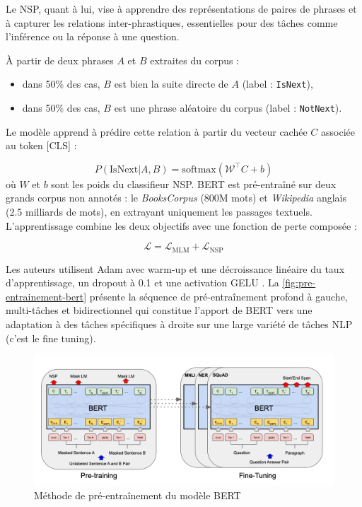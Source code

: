 Le NSP, quant à lui, vise à apprendre des représentations de paires de phrases et à capturer les relations inter-phrastiques, essentielles pour des tâches comme l'inférence ou la réponse à une question.

À partir de deux phrases $A$ et $B$ extraites du corpus :
\begin{itemize}
    \item dans 50\% des cas, $B$ est bien la suite directe de $A$ (label : \texttt{IsNext}),
    \item dans 50\% des cas, $B$ est une phrase aléatoire du corpus (label : \texttt{NotNext}).
\end{itemize}

Le modèle apprend à prédire cette relation à partir du vecteur cachée $C$ associée au token [CLS] :

\begin{equation}
P(\text{IsNext}|A,B) = \mathrm{softmax}(\mathcal{W}^\top C + b)
\end{equation}
o\`u $W$ et $b$ sont les poids du classifieur NSP. BERT est pré-entraîné sur deux grands corpus non annotés : le \textit{BooksCorpus} (800M mots) et \textit{Wikipedia} anglais (2.5 milliards de mots), en extrayant uniquement les passages textuels.\\

L'apprentissage combine les deux objectifs avec une fonction de perte composée :

\begin{equation}
\mathcal{L} = \mathcal{L}_{\text{MLM}} + \mathcal{L}_{\text{NSP}}
\end{equation}

Les auteurs utilisent Adam avec warm-up et une décroissance linéaire du taux d'apprentissage, un dropout à 0.1 et une activation GELU \citep{hendrycks2016gaussian}. La \autoref{fig:pre-entrainement-bert} présente la séquence de pré-entraînement profond à gauche, multi-tâches et bidirectionnel  qui constitue l'apport de BERT vers une adaptation à des tâches spécifiques à droite sur une large variété de tâches NLP (c'est le fine tuning).

\begin{figure}[H]
    \centering
    \includegraphics[scale=0.6]{images/BERT_entrainement.png}
    \caption{Méthode de pré-entraînement du modèle BERT}
    \label{fig:pre-entrainement-bert}
\end{figure}

